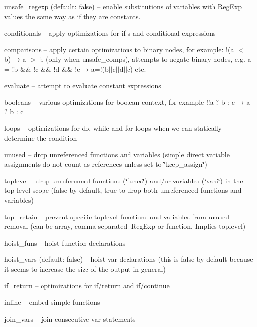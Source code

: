 \begin{DoxyItemize}
\item {\ttfamily unsafe\+\_\+regexp} (default\+: false) -- enable substitutions of variables with {\ttfamily Reg\+Exp} values the same way as if they are constants.
\item {\ttfamily conditionals} -- apply optimizations for {\ttfamily if}-\/s and conditional expressions
\item {\ttfamily comparisons} -- apply certain optimizations to binary nodes, for example\+: {\ttfamily !(a $<$= b) → a $>$ b} (only when {\ttfamily unsafe\+\_\+comps}), attempts to negate binary nodes, e.\+g. {\ttfamily a = !b \&\& !c \&\& !d \&\& !e → a=!(b$\vert$$\vert$c$\vert$$\vert$d$\vert$$\vert$e)} etc.
\item {\ttfamily evaluate} -- attempt to evaluate constant expressions
\item {\ttfamily booleans} -- various optimizations for boolean context, for example {\ttfamily !!a ? b \+: c → a ? b \+: c}
\item {\ttfamily loops} -- optimizations for {\ttfamily do}, {\ttfamily while} and {\ttfamily for} loops when we can statically determine the condition
\item {\ttfamily unused} -- drop unreferenced functions and variables (simple direct variable assignments do not count as references unless set to {\ttfamily \char`\"{}keep\+\_\+assign\char`\"{}})
\item {\ttfamily toplevel} -- drop unreferenced functions ({\ttfamily \char`\"{}funcs\char`\"{}}) and/or variables ({\ttfamily \char`\"{}vars\char`\"{}}) in the top level scope ({\ttfamily false} by default, {\ttfamily true} to drop both unreferenced functions and variables)
\item {\ttfamily top\+\_\+retain} -- prevent specific toplevel functions and variables from {\ttfamily unused} removal (can be array, comma-\/separated, Reg\+Exp or function. Implies {\ttfamily toplevel})
\item {\ttfamily hoist\+\_\+funs} -- hoist function declarations
\item {\ttfamily hoist\+\_\+vars} (default\+: false) -- hoist {\ttfamily var} declarations (this is {\ttfamily false} by default because it seems to increase the size of the output in general)
\item {\ttfamily if\+\_\+return} -- optimizations for if/return and if/continue
\item {\ttfamily inline} -- embed simple functions
\item {\ttfamily join\+\_\+vars} -- join consecutive {\ttfamily var} statements

\end{DoxyItemize}
